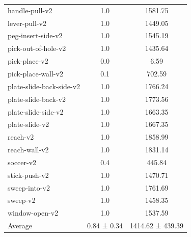 \begin{table}[]
\begin{tabular}{l c c}
                  handle-pull-v2 &    1.0 &    1581.75  \\
                   lever-pull-v2 &    1.0 &    1449.05  \\
              peg-insert-side-v2 &    1.0 &    1545.19  \\
             pick-out-of-hole-v2 &    1.0 &    1435.64  \\
                   pick-place-v2 &    0.0 &       6.59  \\
              pick-place-wall-v2 &    0.1 &     702.59  \\
        plate-slide-back-side-v2 &    1.0 &    1766.24  \\
             plate-slide-back-v2 &    1.0 &    1773.56  \\
             plate-slide-side-v2 &    1.0 &    1663.35  \\
                  plate-slide-v2 &    1.0 &    1667.35  \\
                        reach-v2 &    1.0 &    1858.99  \\
                   reach-wall-v2 &    1.0 &    1831.14  \\
                       soccer-v2 &    0.4 &     445.84  \\
                   stick-push-v2 &    1.0 &    1470.71  \\
                   sweep-into-v2 &    1.0 &    1761.69  \\
                        sweep-v2 &    1.0 &    1458.35  \\
                  window-open-v2 &    1.0 &    1537.59  \\
                  \midrule
             Average &  0.84 ± 0.34 & 1414.62 ± 439.39 \\
    \bottomrule
    \end{tabular}
    \label{tab:mt40}
\end{table}

